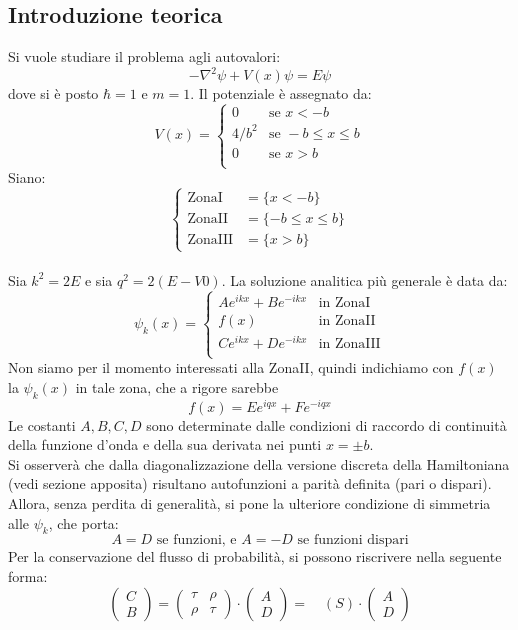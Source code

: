 \subsection{Introduzione teorica}
Si vuole studiare il problema agli autovalori:
$$ -\nabla^2\psi + V(x)\psi = E \psi $$
dove si è posto $\hbar = 1$ e $m = 1$. Il potenziale è assegnato da:
$$ V(x)  = \begin{cases}
        0       & \mbox{se } x<-b \\
        4/b^2   & \mbox{se } -b \leq x \leq b \\
        0       & \mbox{se } x>b \\
         \end{cases}
$$
Siano:
$$ \begin{cases}
    \mbox{ZonaI} & = \{x<-b \} \\
    \mbox{ZonaII} & = \{-b \leq x \leq b\} \\
    \mbox{ZonaIII} & = \{x>b\}
\end{cases} $$
\\
Sia $k^2 = 2E$ e sia $q^2 = 2(E-V0)$. La soluzione analitica più generale è data da:
$$\psi_k(x) =
    \begin{cases}
        Ae^{ikx}+Be^{-ikx} & \mbox{in ZonaI} \\
        f(x) & \mbox{in ZonaII} \\
        Ce^{ikx}+De^{-ikx} & \mbox{in ZonaIII} \\
    \end{cases}
$$
Non siamo per il momento interessati alla ZonaII, quindi indichiamo con
$f(x)$ la $\psi_k(x)$ in tale zona, che a rigore sarebbe
    $$f(x)= Ee^{iqx}+Fe^{-iqx}$$
Le costanti $A,B,C,D$ sono determinate dalle condizioni di raccordo di continuità della
funzione d'onda e della sua derivata nei punti $x=\pm b$.\\
Si osserverà che dalla diagonalizzazione della versione discreta della Hamiltoniana
(vedi sezione apposita) risultano autofunzioni a parità definita (pari o dispari).
Allora, senza perdita di generalità, si pone la ulteriore condizione di simmetria alle $\psi_k$, che porta:
    $$ A = D \mbox{ se funzioni, e } A = -D \mbox{ se funzioni dispari}$$
Per la conservazione del flusso di probabilità, si possono riscrivere nella seguente forma:
$$
    \begin{pmatrix} C \\ B \end{pmatrix} =
    \begin{pmatrix} \tau & \rho \\ \rho & \tau \end{pmatrix} \cdot
    \begin{pmatrix} A \\ D \end{pmatrix} = \quad (S)\cdot \begin{pmatrix} A \\ D \end{pmatrix}
$$
